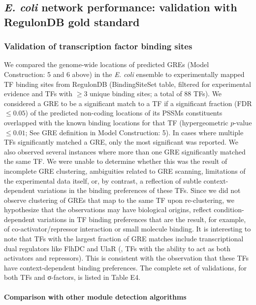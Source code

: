 \subsection{{\it E. coli} network performance: validation with RegulonDB gold standard}

\subsubsection{Validation of transcription factor binding sites}

We compared the genome-wide locations of predicted GREs (Model
Construction: 5 and 6 above) in the {\it E. coli} ensemble to experimentally
mapped TF binding sites from RegulonDB (BindingSiteSet table, filtered
for experimental evidence and TFs with $\geq 3$ unique binding sites; a
total of 88 TFs). We considered a GRE to be a significant match to a
TF if a significant fraction (FDR $\leq 0.05$) of the predicted non-coding
locations of its PSSMs constituents overlapped with the known binding
locations for that TF (hypergeometric $p$-value $\leq 0.01$; See GRE
definition in Model Construction: 5). In cases where multiple TFs
significantly matched a GRE, only the most significant was
reported. We also observed several instances where more than one GRE
significantly matched the same TF. We were unable to determine whether
this was the result of incomplete GRE clustering, ambiguities related
to GRE scanning, limitations of the experimental data itself, or, by
contrast, a reflection of subtle context-dependent variations in the
binding preferences of these TFs. Since we did not observe clustering
of GREs that map to the same TF upon re-clustering, we hypothesize
that the observations may have biological origins, \ie reflect
condition-dependent variations in TF binding preferences that are the
result, for example, of co-activator/repressor interaction or small
molecule binding. It is interesting to note that TFs with the largest
fraction of GRE matches include transcriptional dual regulators like
FlhDC and UlaR (\ie, TFs with the ability to act as both activators
and repressors). This is consistent with the observation that these
TFs have context-dependent binding preferences. The complete set of
validations, for both TFs and σ-factors, is listed in Table E4.

\paragraph{Comparison with other module detection algorithms}

